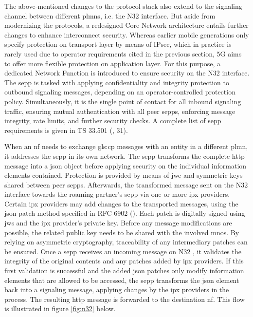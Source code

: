 The above-mentioned changes to the protocol stack also extend to the signaling channel between different \glspl{plmn}, i.e. the N32 interface.
But aside from modernizing the protocols, a redesigned Core Network architecture entails further changes to enhance interconnect security.
Whereas earlier mobile generations only specify protection on transport layer by means of IPsec, which in practice is rarely used due to operator requirements cited in the previous section, 5G aims to offer more flexible protection on application layer.
For this purpose, a dedicated Network Function is introduced to ensure security on the N32 interface.
The \gls{sepp} is tasked with applying confidentiality and integrity protection to outbound signaling messages, depending on an operator-controlled protection policy.
Simultaneously, it is the single point of contact for all inbound signaling traffic, ensuring mutual authentication with all peer \glspl{sepp}, enforcing message integrity, rate limits, and further security checks.
A complete list of \gls{sepp} requirements is given in TS 33.501 (\cite{3gpp.33.501}, 31).

When an \gls{nf} needs to exchange \gls{gls:cp} messages with an entity in a different \gls{plmn}, it addresses the \gls{sepp} in its own network.
The \gls{sepp} transforms the complete \gls{http} message into a \gls{json} object before applying security on the individual information elements contained.
Protection is provided by means of \gls{jwe} and symmetric keys shared between peer \glspl{sepp}.
Afterwards, the transformed message sent on the N32 interface towards the roaming partner's \gls{sepp} via one or more \gls{ipx} providers.
Certain \gls{ipx} providers may add changes to the transported messages, using the \gls{json} patch method specified in RFC 6902  (\cite{rfc6902}).
Each patch is digitally signed using \gls{jws} and the \gls{ipx} provider's private key.
Before any message modifications are possible, the related public key needs to be shared with the involved \glspl{mno}.
By relying on asymmetric cryptography, traceability of any intermediary patches can be ensured.
Once a \gls{sepp} receives an incoming message on N32 , it validates the integrity of the original contents and any patches added by \gls{ipx} providers.
If this first validation is successful and the added \gls{json} patches only modify information elements that are allowed to be accessed, the \gls{sepp} transforms the \gls{json} element back into a signaling message, applying changes by the \gls{ipx} providers in the process.
The resulting \gls{http} message is forwarded to the destination \gls{nf}.
This flow is illustrated in figure \ref{fig:n32} below.

